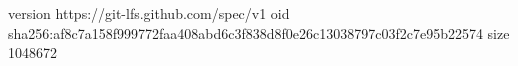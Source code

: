version https://git-lfs.github.com/spec/v1
oid sha256:af8c7a158f999772faa408abd6c3f838d8f0e26c13038797c03f2c7e95b22574
size 1048672
